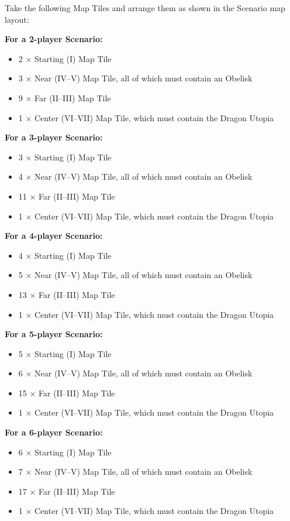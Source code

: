 \begin{multicols*}{2}
\begin{itemize}
Take the following Map Tiles and arrange them as shown in the Scenario map layout:

\textbf{For a 2-player Scenario:}
\begin{itemize}
  \item 2 × Starting (I) Map Tile
  \item 3 × Near (IV--V) Map Tile, all of which must contain an Obelisk
  \item 9 × Far (II--III) Map Tile
  \item 1 × Center (VI--VII) Map Tile, which must contain the Dragon Utopia
\end{itemize}

\textbf{For a 3-player Scenario:}
\begin{itemize}
  \item 3 × Starting (I) Map Tile
  \item 4 × Near (IV--V) Map Tile, all of which must contain an Obelisk
  \item 11 × Far (II--III) Map Tile
  \item 1 × Center (VI--VII) Map Tile, which must contain the Dragon Utopia
\end{itemize}

\textbf{For a 4-player Scenario:}
\begin{itemize}
  \item 4 × Starting (I) Map Tile
  \item 5 × Near (IV--V) Map Tile, all of which must contain an Obelisk
  \item 13 × Far (II--III) Map Tile
  \item 1 × Center (VI--VII) Map Tile, which must contain the Dragon Utopia
\end{itemize}

\textbf{For a 5-player Scenario:}
\begin{itemize}
  \item 5 × Starting (I) Map Tile
  \item 6 × Near (IV--V) Map Tile, all of which must contain an Obelisk
  \item 15 × Far (II--III) Map Tile
  \item 1 × Center (VI--VII) Map Tile, which must contain the Dragon Utopia
\end{itemize}

\textbf{For a 6-player Scenario:}
\begin{itemize}
  \item 6 × Starting (I) Map Tile
  \item 7 × Near (IV--V) Map Tile, all of which must contain an Obelisk
  \item 17 × Far (II--III) Map Tile
  \item 1 × Center (VI--VII) Map Tile, which must contain the Dragon Utopia
\end{itemize}


\end{itemize}
\end{multicols*}
